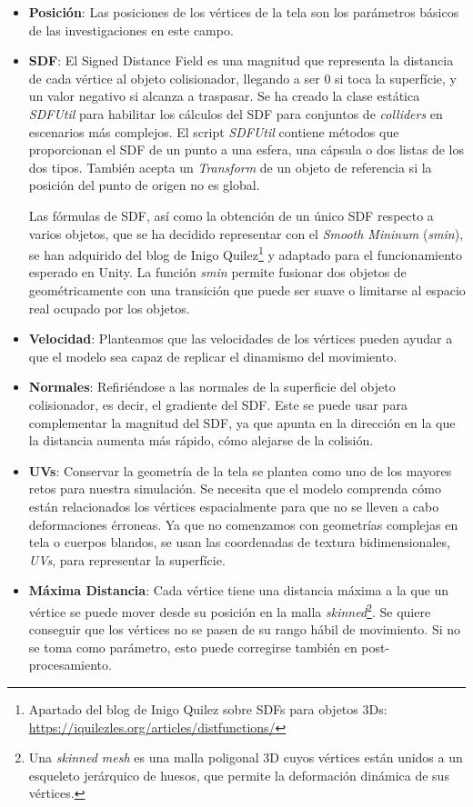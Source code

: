 \begin{itemize}
    \item \textbf{Posición}: Las posiciones de los vértices de la tela son los parámetros básicos de las investigaciones en este campo.
    \item \textbf{SDF}: El Signed Distance Field es una magnitud que representa la distancia de cada vértice al objeto colisionador, llegando a ser 0 si toca la superfície, y un valor negativo si alcanza a traspasar. Se ha creado la clase estática \textit{SDFUtil} para habilitar los cálculos del SDF para conjuntos de \textit{colliders} en escenarios más complejos. El script \textit{SDFUtil} contiene métodos que proporcionan el SDF de un punto a una esfera, una cápsula o dos listas de los dos tipos. También acepta un \textit{Transform} de un objeto de referencia si la posición del punto de origen no es global.

    Las fórmulas de SDF, así como la obtención de un único SDF respecto a varios objetos, que se ha decidido representar con el \textit{Smooth Mininum} (\textit{smin}), se han adquirido del blog de Inigo Quilez\footnote{Apartado del blog de Inigo Quilez sobre SDFs para objetos 3Ds: \url{https://iquilezles.org/articles/distfunctions/}} y adaptado para el funcionamiento esperado en Unity. La función \textit{smin} permite fusionar dos objetos de geométricamente con una transición que puede ser suave o limitarse al espacio real ocupado por los objetos.

    \item \textbf{Velocidad}: Planteamos que las velocidades de los vértices pueden ayudar a que el modelo sea capaz de replicar el dinamismo del movimiento. 
    \item \textbf{Normales}: Refiriéndose a las normales de la superficie del objeto colisionador, es decir, el gradiente del SDF. Este se puede usar para complementar la magnitud del SDF, ya que apunta en la dirección en la que la distancia aumenta más rápido, cómo alejarse de la colisión.
    \item \textbf{UVs}: Conservar la geometría de la tela se plantea como uno de los mayores retos para nuestra simulación. Se necesita que el modelo comprenda cómo están relacionados los vértices espacialmente para que no se lleven a cabo deformaciones érroneas. Ya que no comenzamos con geometrías complejas en tela o cuerpos blandos, se usan las coordenadas de textura bidimensionales, \textit{UVs}, para representar la superfície.
    \item \textbf{Máxima Distancia}: Cada vértice tiene una distancia máxima a la que un vértice se puede mover desde su posición en la malla \textit{skinned}\footnote{Una \textit{skinned mesh} es una malla poligonal 3D cuyos vértices están unidos a un esqueleto jerárquico de huesos, que permite la deformación dinámica de sus vértices.}. Se quiere conseguir que los vértices no se pasen de su rango hábil de movimiento. Si no se toma como parámetro, esto puede corregirse también en post-procesamiento.
\end{itemize}

